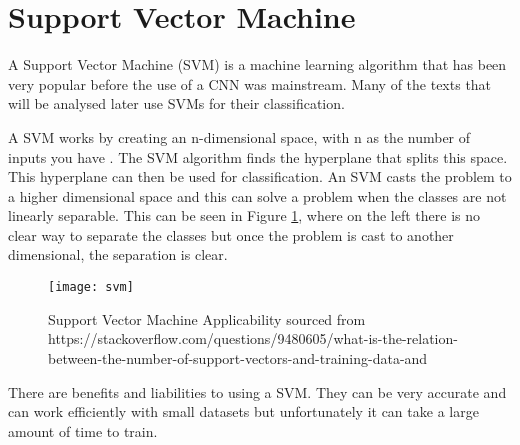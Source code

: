 \section{Support Vector Machine}
A Support Vector Machine (SVM) is a machine learning algorithm that has been
very popular before the use of a CNN was mainstream.
Many of the texts that will be analysed later use SVMs for their classification.

A SVM works by creating an n-dimensional space, with n as the number of
inputs you have \parencite{svm}. The SVM algorithm finds the hyperplane that splits this space.
This hyperplane can then be used for classification. 
An SVM casts the problem to a higher dimensional space and this can solve a problem when the classes are not linearly separable.
This can be seen in Figure \ref{fig:svm}, where on the left there is no clear way to separate the classes but once the problem is cast to another dimensional, the separation is clear.

\begin{figure}[h]
    \texttt{[image: svm]}
    \caption{Support Vector Machine Applicability sourced from https://stackoverflow.com/questions/9480605/what-is-the-relation-between-the-number-of-support-vectors-and-training-data-and}
    \label{fig:svm}
\end{figure}

There are benefits and liabilities to using a SVM.
They can be very accurate and can work efficiently with small datasets but unfortunately it can take a large amount of time to train. 